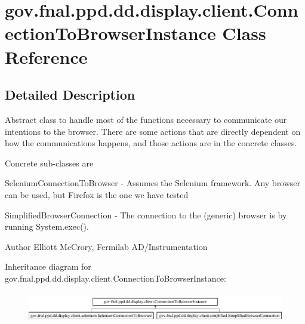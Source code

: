\hypertarget{classgov_1_1fnal_1_1ppd_1_1dd_1_1display_1_1client_1_1ConnectionToBrowserInstance}{\section{gov.\-fnal.\-ppd.\-dd.\-display.\-client.\-Connection\-To\-Browser\-Instance Class Reference}
\label{classgov_1_1fnal_1_1ppd_1_1dd_1_1display_1_1client_1_1ConnectionToBrowserInstance}
}


\subsection{Detailed Description}
Abstract class to handle most of the functions necessary to communicate our intentions to the browser. There are some actions that are directly dependent on how the communications happens, and those actions are in the concrete classes. 

Concrete sub-\/classes are 
\begin{DoxyItemize}
\item Selenium\-Connection\-To\-Browser -\/ Assumes the Selenium framework. Any browser can be used, but Firefox is the one we have tested  
\item Simplified\-Browser\-Connection -\/ The connection to the (generic) browser is by running System.\-exec(). 
\begin{DoxyItemize}
\item 
\end{DoxyItemize}



\begin{DoxyAuthor}{Author}
Elliott Mc\-Crory, Fermilab A\-D/\-Instrumentation 
\end{DoxyAuthor}

\end{DoxyItemize}Inheritance diagram for gov.\-fnal.\-ppd.\-dd.\-display.\-client.\-Connection\-To\-Browser\-Instance\-:\begin{figure}[H]
\begin{center}
\leavevmode
\includegraphics[height=1.333333cm]{classgov_1_1fnal_1_1ppd_1_1dd_1_1display_1_1client_1_1ConnectionToBrowserInstance}
\end{center}
\end{figure}
